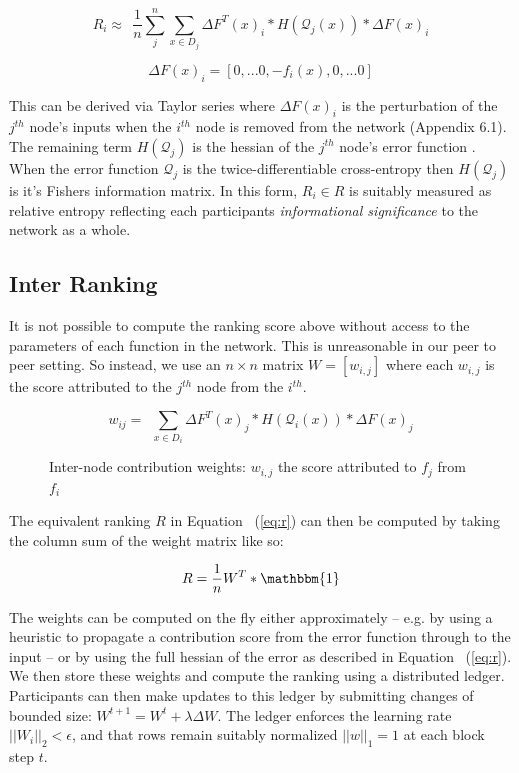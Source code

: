 \documentclass{article}
\begin{document}
\begin{equation}
\label{eq:r}
R_i \approx \ \ \frac{1}{n} \sum_{j}^{n} \sum_{x \in D_j} \Delta F^T(x)_i * H(\mathcal{Q}_j(x)) * \Delta F(x)_i 
\end{equation}

\[ \Delta F (x)_i = [0, ... 0, -f_i(x), 0, ... 0] \]

 This can be derived via Taylor series where $\Delta F (x)_i$ is the perturbation of the $j^{th}$ node's inputs when the $i^{th}$ node is removed from the network (Appendix 6.1). The remaining term $H(\mathcal{Q}_j)$ is the hessian of the $j^{th}$ node's error function \cite{yu2017nisp}. When the error function $\mathcal{Q}_j$ is the twice-differentiable cross-entropy then $H(\mathcal{Q}_j)$ is it's Fishers information matrix. In this form, $R_i \in R$ is suitably measured as relative entropy reflecting each participants \textit{informational significance} to the network as a whole.

\subsection{Inter Ranking}
\label{sec:inter-ranking}
It is not possible to compute the ranking score above without access to the parameters of each function in the network. This is unreasonable in our peer to peer setting. So instead, we use an $n \times n$ matrix $W = [w_{i,j}]$ where each $w_{i,j}$ is the score attributed to the $j^{th}$ node from the $i^{th}$. 

\begin{equation}
\label{eq:w}
w_{ij} = \ \ \sum_{x \in D_i} \Delta F^T(x)_j * H(\mathcal{Q}_i(x)) * \Delta F(x)_j
\end{equation}

\begin{figure}[H]
	\centering
	\hspace*{-2cm}
	
	\caption{Inter-node contribution weights: $w_{i,j}$ the score attributed to $f_j$ from $f_i$}
\end{figure}{}

The equivalent ranking $R$ in Equation ~(\ref{eq:r}) can then be computed by taking the column sum of the weight matrix like so:

\begin{equation}
\label{eq:equiv_ranking}
R = \frac{1}{n} W^T * \mathbbm{1}
\end{equation}

The weights can be computed on the fly either approximately -- e.g. by using a heuristic to propagate a contribution score from the error function through to the input \cite{yu2017nisp} -- or by using the full hessian of the error as described in Equation ~(\ref{eq:r}). We then store these weights and compute the ranking using a distributed ledger. Participants can then make updates to this ledger by submitting changes of bounded size: $W^{t+1}= W^t + \lambda \Delta W$. The ledger enforces the learning rate $||W_i||_2 < \epsilon$, and that rows remain suitably normalized $||w||_1 = 1$ at each block step $t$.  
\end{document}
